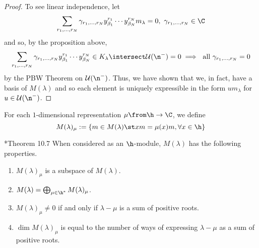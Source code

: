 \documentclass[11pt,leqno,oneside]{amsart}
\numberwithin{thm}{section}
\newcommand{\U}{\mathcal{U}}
\begin{document}
\begin{proof}
  To see linear independence, let \[
    \sum_{r_1, \ldots, r_N}  \gamma_{r_1, \ldots, r_N}
    y_{\beta_1}^{r_1} \cdots y_{\beta_N}^{r_N} m_\lambda = 0, \
    \gamma_{r_1, \ldots, r_N} \in \C
  \]
  and so, by the proposition above, \[
    \sum_{r_1, \ldots, r_N}  \gamma_{r_1, \ldots, r_N}
    y_{\beta_1}^{r_1} \cdots y_{\beta_N}^{r_N} \in K_\lambda
    \intersect \U(\n^-) = 0 \implies \text{ all } \gamma_{r_1,\ldots,
      r_N} = 0
  \]
  by the PBW Theorem on \(\U(\n^-)\). Thus, we have shown that we, in
  fact, have a basis of \(M(\lambda)\) and so each element is uniquely
  expressible in the form \(um_\lambda\) for \(u \in \U(\n^-)\).
\end{proof}
\begin{defn}
  For each \(1\)-dimensional representation \(\mu \from \h \to \C\),
  we define \[
    M(\lambda)_\mu := \{m \in M(\lambda) \st xm = \mu(x)m, \forall x
    \in \h\}
  \]
\end{defn}
\begin{prop}\label{verma-props}
  \cite{carter}*{Theorem 10.7} When considered as an \(\h\)-module, \(M(\lambda)\) has the
  following properties.
  \begin{enumerate}
  \item \(M(\lambda)_\mu\) is a subspace of \(M(\lambda)\).
  \item \(M(\lambda) = \bigoplus_{\mu \in \h^*} M(\lambda)_\mu\).
  \item \(M(\lambda)_\mu \neq 0\) if and only if \(\lambda-\mu\) is
    a sum of positive roots.
  \item \(\dim M(\lambda)_\mu\) is equal to the number of ways of
    expressing \(\lambda-\mu\) as a sum of positive roots.
  \end{enumerate}
\end{prop}
\end{document}
